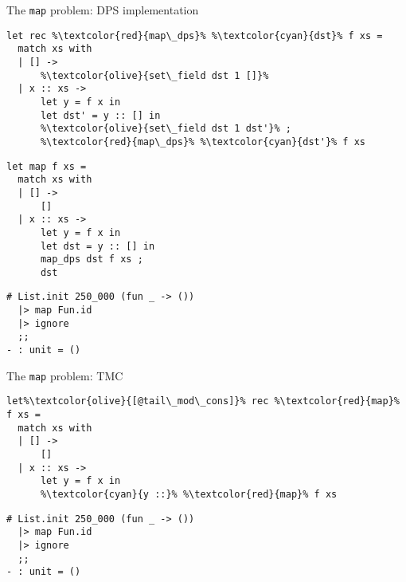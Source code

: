 \begin{frame}[fragile]{The \texttt{map} problem: DPS implementation}
\begin{adjustwidth}{-1.5em}{-1.5em}
\begin{minipage}{0.5\linewidth}
\begin{lstlisting}
let rec %\textcolor{red}{map\_dps}% %\textcolor{cyan}{dst}% f xs =
  match xs with
  | [] ->
      %\textcolor{olive}{set\_field dst 1 []}%
  | x :: xs ->
      let y = f x in
      let dst' = y :: [] in
      %\textcolor{olive}{set\_field dst 1 dst'}% ;
      %\textcolor{red}{map\_dps}% %\textcolor{cyan}{dst'}% f xs
\end{lstlisting}
\end{minipage}
\begin{minipage}{0.45\linewidth}
\begin{lstlisting}
let map f xs =
  match xs with
  | [] ->
      []
  | x :: xs ->
      let y = f x in
      let dst = y :: [] in
      map_dps dst f xs ;
      dst
\end{lstlisting}
\end{minipage}
\vfill
\begin{lstlisting}
# List.init 250_000 (fun _ -> ())
  |> map Fun.id
  |> ignore
  ;;
- : unit = ()
\end{lstlisting}
\end{adjustwidth}
\end{frame}

\begin{frame}[fragile]{The \texttt{map} problem: TMC}
\begin{lstlisting}
let%\textcolor{olive}{[@tail\_mod\_cons]}% rec %\textcolor{red}{map}% f xs =
  match xs with
  | [] ->
      []
  | x :: xs ->
      let y = f x in
      %\textcolor{cyan}{y ::}% %\textcolor{red}{map}% f xs
\end{lstlisting}
\vfill
\begin{lstlisting}
# List.init 250_000 (fun _ -> ())
  |> map Fun.id
  |> ignore
  ;;
- : unit = ()
\end{lstlisting}
\end{frame}